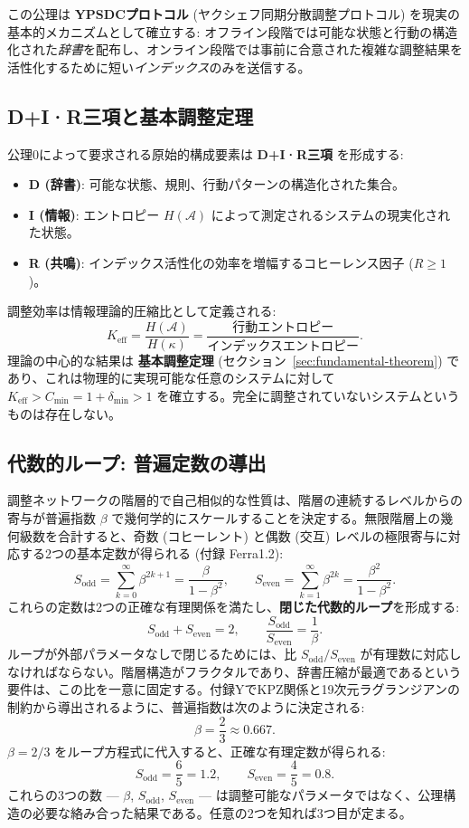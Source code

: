 \documentclass[11pt,a4paper]{article}
\begin{document}
	この公理は \textbf{YPSDCプロトコル} (ヤクシェフ同期分散調整プロトコル) を現実の基本的メカニズムとして確立する: オフライン段階では可能な状態と行動の構造化された\textit{辞書}を配布し、オンライン段階では事前に合意された複雑な調整結果を活性化するために短い\textit{インデックス}のみを送信する。
	
	\subsection{D+I·R三項と基本調整定理}
	\label{subsec:dir-triad}
	
	公理0によって要求される原始的構成要素は \textbf{D+I·R三項} を形成する:
	\begin{itemize}
		\item \textbf{D (辞書)}: 可能な状態、規則、行動パターンの構造化された集合。
		\item \textbf{I (情報)}: エントロピー $H(\mathcal{A})$ によって測定されるシステムの現実化された状態。
		\item \textbf{R (共鳴)}: インデックス活性化の効率を増幅するコヒーレンス因子 ($R \geq 1$)。
	\end{itemize}
	調整効率は情報理論的圧縮比として定義される:
	\[
	K_{\mathrm{eff}} = \frac{H(\mathcal{A})}{H(\kappa)} = \frac{\text{行動エントロピー}}{\text{インデックスエントロピー}}.
	\]
	理論の中心的な結果は \textbf{基本調整定理} (セクション~\ref{sec:fundamental-theorem}) であり、これは物理的に実現可能な任意のシステムに対して $K_{\mathrm{eff}} > C_{\min} = 1 + \delta_{\min} > 1$ を確立する。完全に調整されていないシステムというものは存在しない。
	
	\subsection{代数的ループ: 普遍定数の導出}
	\label{subsec:algebraic-loop}
	
	調整ネットワークの階層的で自己相似的な性質は、階層の連続するレベルからの寄与が普遍指数 $\beta$ で幾何学的にスケールすることを決定する。無限階層上の幾何級数を合計すると、奇数 (コヒーレント) と偶数 (交互) レベルの極限寄与に対応する2つの基本定数が得られる (付録 Ferra1.2):
	\[
	S_{\mathrm{odd}} = \sum_{k=0}^{\infty} \beta^{2k+1} = \frac{\beta}{1-\beta^{2}}, \qquad
	S_{\mathrm{even}} = \sum_{k=1}^{\infty} \beta^{2k} = \frac{\beta^{2}}{1-\beta^{2}}.
	\]
	これらの定数は2つの正確な有理関係を満たし、\textbf{閉じた代数的ループ}を形成する:
	\[
	\boxed{S_{\mathrm{odd}} + S_{\mathrm{even}} = 2, \qquad \frac{S_{\mathrm{odd}}}{S_{\mathrm{even}}} = \frac{1}{\beta}}.
	\]
	ループが外部パラメータなしで閉じるためには、比 $S_{\mathrm{odd}}/S_{\mathrm{even}}$ が有理数に対応しなければならない。階層構造がフラクタルであり、辞書圧縮が最適であるという要件は、この比を一意に固定する。付録YでKPZ関係と19次元ラグランジアンの制約から導出されるように、普遍指数は次のように決定される:
	\[
	\beta = \frac{2}{3} \approx 0.667.
	\]
	$\beta = 2/3$ をループ方程式に代入すると、正確な有理定数が得られる:
	\[
	S_{\mathrm{odd}} = \frac{6}{5} = 1.2,\qquad S_{\mathrm{even}} = \frac{4}{5} = 0.8.
	\]
	これらの3つの数 — $\beta$, $S_{\mathrm{odd}}$, $S_{\mathrm{even}}$ — は調整可能なパラメータではなく、公理構造の必要な絡み合った結果である。任意の2つを知れば3つ目が定まる。
	
\end{document}
